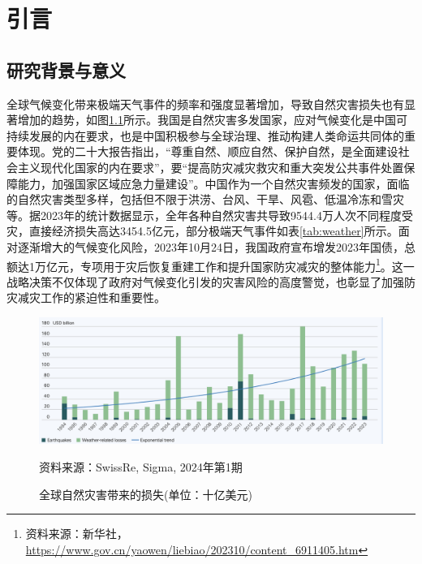 \chapter{引言}
\section{研究背景与意义}

全球气候变化带来极端天气事件的频率和强度显著增加，导致自然灾害损失也有显著增加的趋势，如图\ref{fig:swissre}所示。我国是自然灾害多发国家，应对气候变化是中国可持续发展的内在要求，也是中国积极参与全球治理、推动构建人类命运共同体的重要体现。党的二十大报告指出，“尊重自然、顺应自然、保护自然，是全面建设社会主义现代化国家的内在要求”，要“提高防灾减灾救灾和重大突发公共事件处置保障能力，加强国家区域应急力量建设”。中国作为一个自然灾害频发的国家，面临的自然灾害类型多样，包括但不限于洪涝、台风、干旱、风雹、低温冷冻和雪灾等。据2023年的统计数据显示，全年各种自然灾害共导致9544.4万人次不同程度受灾，直接经济损失高达3454.5亿元，部分极端天气事件如表\ref{tab:weather}所示。面对逐渐增大的气候变化风险，2023年10月24日，我国政府宣布增发2023年国债，总额达1万亿元，专项用于灾后恢复重建工作和提升国家防灾减灾的整体能力\footnote{资料来源：新华社，\url{https://www.gov.cn/yaowen/liebiao/202310/content_6911405.htm}}。这一战略决策不仅体现了政府对气候变化引发的灾害风险的高度警觉，也彰显了加强防灾减灾工作的紧迫性和重要性。

\begin{figure}[htbp]
    \includegraphics[width=\linewidth]{img/disaster.png}
    \caption{全球自然灾害带来的损失(单位：十亿美元)}\label{fig:swissre}
    \qquad {} 资料来源：SwissRe, Sigma, 2024年第1期
\end{figure}

